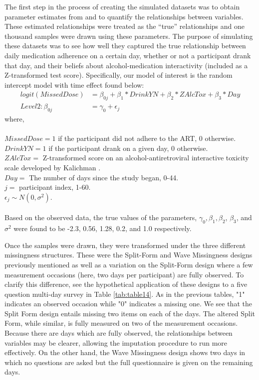\documentclass{svjour3}                     %
\begin{document}
The first step in the process of creating the simulated datasets was to obtain parameter estimates from \citet{pellowski2016alcohol} and to quantify the relationships between variables. These estimated relationships were treated as the “true” relationships and one thousand samples were drawn using these parameters. The purpose of simulating these datasets was to see how well they captured the true relationship between daily medication adherence on a certain day, whether or not a participant drank that day, and their beliefs about alcohol-medication interactivity (included as a Z-transformed test score). Specifically, our model of interest is the random intercept model with time effect found below: \\

\begin{align*}
logit(MissedDose) &= \beta_{0j} + \beta_1*DrinkYN + \beta_2*ZAlcTox +\beta_3*Day \\
Level 2: \beta_{0j} &= \gamma_0 + \epsilon_j
\end{align*}
where, \\ \\
$MissedDose = 1$ if the participant did not adhere to the ART, 0 otherwise. \\
$DrinkYN = 1$ if the participant drank on a given day, 0 otherwise.\\
$ZAlcTox =$ Z-transformed score on an alcohol-antiretroviral interactive toxicity scale developed by Kalichman \cite{kalichman2009prevalence}. \\
$Day =$ The number of days since the study began, 0-44. \\
$j =$ participant index, 1-60. \\
$\epsilon_j  \sim N(0, \sigma^2)$. \\ \\


Based on the observed data, the true values of the parameters, $\gamma_0, \beta_1, \beta_2$, $\beta_3$, and $\sigma^2$ were found to be -2.3, 0.56, 1.28, 0.2, and 1.0 respectively. \par
Once the samples were drawn, they were transformed under the three different missingness structures. These were the Split-Form and Wave Missingness designs previously mentioned as well as a variation on the Split-Form design where a few measurement occasions (here, two days per participant) are fully observed. To clarify this difference, see the hypothetical application of these designs to a five question multi-day survey in Table \ref{tab:table14}. As in the previous tables, "1" indicates an observed occasion while "0" indicates a missing one. We see that the Split Form design entails missing two items on each of the days. The altered Split Form, while similar, is fully measured on two of the measurement occasions. Because there are days which are fully observed, the relationships between variables may be clearer, allowing the imputation procedure to run more effectively. On the other hand, the Wave Missingness design shows two days in which no questions are asked but the full questionnaire is given on the remaining days. \par
\end{document}
